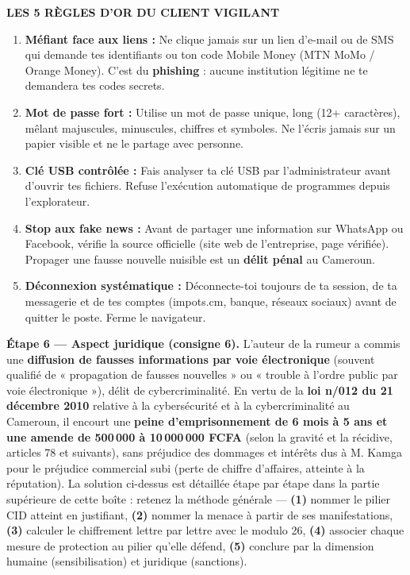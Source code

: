 \documentclass[11pt]{article}
\begin{document}
\begin{exoresolu}
\begin{center}
\textbf{\large LES 5 RÈGLES D'OR DU CLIENT VIGILANT}
\end{center}
\begin{enumerate}
  \item \textbf{Méfiant face aux liens :} Ne clique jamais sur un lien d'e-mail ou de SMS qui demande tes identifiants ou ton code Mobile Money (MTN MoMo / Orange Money). C'est du \textbf{phishing} : aucune institution légitime ne te demandera tes codes secrets.
  \item \textbf{Mot de passe fort :} Utilise un mot de passe unique, long (12+ caractères), mêlant majuscules, minuscules, chiffres et symboles. Ne l'écris jamais sur un papier visible et ne le partage avec personne.
  \item \textbf{Clé USB contrôlée :} Fais analyser ta clé USB par l'administrateur avant d'ouvrir tes fichiers. Refuse l'exécution automatique de programmes depuis l'explorateur.
  \item \textbf{Stop aux fake news :} Avant de partager une information sur WhatsApp ou Facebook, vérifie la source officielle (site web de l'entreprise, page vérifiée). Propager une fausse nouvelle nuisible est un \textbf{délit pénal} au Cameroun.
  \item \textbf{Déconnexion systématique :} Déconnecte-toi toujours de ta session, de ta messagerie et de tes comptes (impots.cm, banque, réseaux sociaux) avant de quitter le poste. Ferme le navigateur.
\end{enumerate}

\textbf{Étape 6 — Aspect juridique (consigne 6).} L'auteur de la rumeur a commis une \textbf{diffusion de fausses informations par voie électronique} (souvent qualifié de « propagation de fausses nouvelles » ou « trouble à l'ordre public par voie électronique »), délit de cybercriminalité. En vertu de la \textbf{loi n/012 du 21 décembre 2010} relative à la cybersécurité et à la cybercriminalité au Cameroun, il encourt une \textbf{peine d'emprisonnement de 6 mois à 5 ans et une amende de 500\,000 à 10\,000\,000 FCFA} (selon la gravité et la récidive, articles 78 et suivants), sans préjudice des dommages et intérêts dus à M. Kamga pour le préjudice commercial subi (perte de chiffre d'affaires, atteinte à la réputation).
\tcblower
La solution ci-dessus est détaillée étape par étape dans la partie supérieure de cette boîte : retenez la méthode générale — \textbf{(1)} nommer le pilier CID atteint en justifiant, \textbf{(2)} nommer la menace à partir de ses manifestations, \textbf{(3)} calculer le chiffrement lettre par lettre avec le modulo 26, \textbf{(4)} associer chaque mesure de protection au pilier qu'elle défend, \textbf{(5)} conclure par la dimension humaine (sensibilisation) et juridique (sanctions).
\end{exoresolu}
\end{document}
